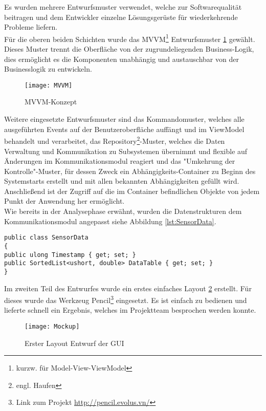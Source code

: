 Es wurden mehrere Entwurfsmuster verwendet, welche zur Softwarequalität beitragen und dem Entwickler einzelne Lösungsgerüste für wiederkehrende Probleme liefern.\\

Für die oberen beiden Schichten wurde das MVVM\footnote{kurzw. für Model-View-ViewModel} Entwurfsmuster \ref{fig:mvvm} gewählt. Dieses Muster trennt die Oberfläche von der zugrundeliegenden Business-Logik, dies ermöglicht es die Komponenten unabhängig und austauschbar von der Businesslogik zu entwickeln.\\ 

\begin{figure}[ht]
	\centering
		\texttt{[image: MVVM]}
		\caption{MVVM-Konzept}
		\label{fig:mvvm}
\end{figure}

Weitere eingesetzte Entwurfsmuster sind das Kommandomuster, welches alle ausgeführten Events auf der Benutzeroberfläche auffängt und im ViewModel behandelt und verarbeitet, das Repository\footnote{engl. Haufen}-Muster, welches die Daten Verwaltung und Kommunikation zu Subsystemen übernimmt und flexible auf Änderungen im Kommunikationsmodul reagiert und das "Umkehrung der Kontrolle"-Muster, für dessen Zweck ein Abhängigkeits-Container zu Beginn des Systemstarts erstellt und mit allen bekannten Abhängigkeiten gefüllt wird. Anschließend ist der Zugriff auf die im Container befindlichen Objekte von jedem Punkt der Anwendung her ermöglicht.\\

Wie bereits in der Analysephase erwähnt, wurden die Datenstrukturen dem Kommunikationsmodul angepasst siehe Abbildung \ref{lst:SensorData}.\\
\begin{lstlisting}[frame=single, caption=Beschreibung der Sensordatenstruktur, label=lst:SensorData]
public class SensorData
{
public ulong Timestamp { get; set; }
public SortedList<ushort, double> DataTable { get; set; }
}
\end{lstlisting}
Im zweiten Teil des Entwurfes wurde ein erstes einfaches Layout \ref{fig:gui} erstellt. Für dieses wurde das Werkzeug Pencil\footnote{Link zum Projekt \url{http://pencil.evolus.vn/}} eingesetzt. Es ist einfach zu bedienen und lieferte schnell ein Ergebnis, welches im Projektteam besprochen werden konnte.

\begin{figure}[ht]
	\centering
		\texttt{[image: Mockup]}
		\caption{Erster Layout Entwurf der GUI}
		\label{fig:gui}
\end{figure}

